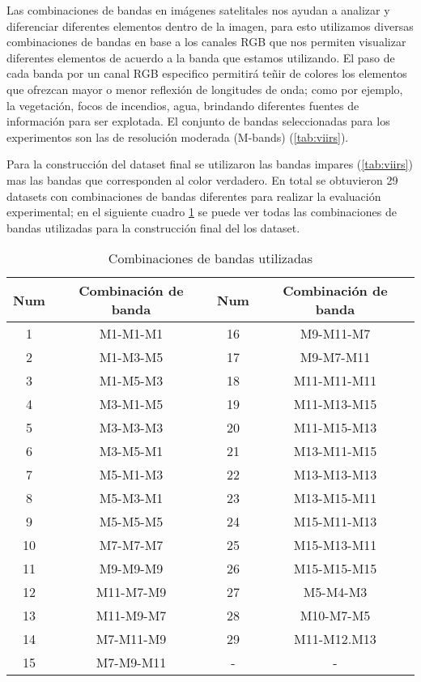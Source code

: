 Las combinaciones de bandas en imágenes satelitales nos ayudan a analizar y diferenciar diferentes elementos dentro de la imagen, para esto utilizamos diversas combinaciones de bandas en base a los canales RGB que nos permiten visualizar diferentes elementos de acuerdo a la banda que estamos utilizando. El paso de cada banda por un canal RGB especifico permitirá teñir de colores los elementos que ofrezcan mayor o menor reflexión de longitudes de onda; como por ejemplo, la vegetación, focos de incendios, agua, brindando diferentes fuentes de información para ser explotada. El conjunto de bandas seleccionadas para los experimentos son las de resolución moderada (M-bands) (\ref{tab:viirs}).
 
Para la construcción del dataset final se utilizaron las bandas impares (\ref{tab:viirs})  mas las bandas que corresponden al color verdadero. En total se obtuvieron 29 datasets con combinaciones de bandas diferentes para realizar la evaluación experimental; en el siguiente cuadro  \ref{tab:combinacion_banda} se puede ver todas las combinaciones de bandas utilizadas para la construcción final del los dataset.

\begin{table}[h] \begin{center}
\begin{tabular}{|c|c||c|c|}\hline 
\textbf{Num} & \textbf{Combinación de banda} & \textbf{Num} & \textbf{Combinación de banda} \\ \hline 
1  	& 	M1-M1-M1 			& 16  & 	M9-M11-M7  \\ \hline
2  	&   M1-M3-M5			& 17  & 	M9-M7-M11\\  \hline
3  	& 	M1-M5-M3			& 18  & 	M11-M11-M11\\ \hline
4  	&   M3-M1-M5 			& 19  & 	M11-M13-M15\\ \hline
5   & 	M3-M3-M3 			& 20  & 	M11-M15-M13\\ \hline
6   & 	M3-M5-M1 			& 21  & 	M13-M11-M15 \\ \hline
7   & 	M5-M1-M3 			& 22  & 	M13-M13-M13\\ \hline
8   & 	M5-M3-M1 			& 23  & 	M13-M15-M11\\ \hline
9   &   M5-M5-M5  			& 24  & 	M15-M11-M13\\ \hline
10  &	M7-M7-M7   			& 25  & 	M15-M13-M11\\ \hline
11  & 	M9-M9-M9   			& 26  & 	M15-M15-M15\\ \hline
12  & 	M11-M7-M9  			& 27  & 	M5-M4-M3\\ \hline
13  & 	M11-M9-M7  			& 28  & 	M10-M7-M5\\ \hline
14  &  	M7-M11-M9  			& 29  & 	M11-M12.M13\\ \hline
15  & 	M7-M9-M11  			& -& -\\ \hline      	
\end{tabular}
\end{center}\caption{Combinaciones de bandas utilizadas \label{tab:combinacion_banda}}
\end{table}


